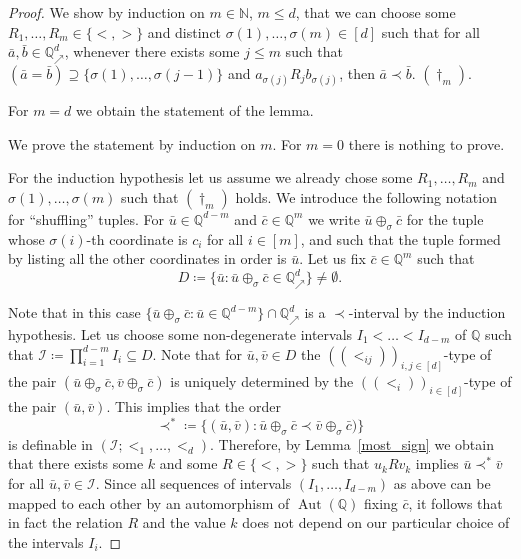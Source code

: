 \documentclass[10pt,a4paper]{amsart}
\newcommand\qup[1]{\mathbb{Q}_\nearrow^{#1}}
\newcommand{\aut}{\operatorname{Aut}}
\newcommand{\shuff}{\oplus}
\begin{document}
\begin{proof}
	We show by induction on $m \in {\mathbb N}$, $m \leq d$, that we can choose some $R_1,\dots,R_m \in \{<,>\}$ and distinct $\sigma(1),\dots,\sigma(m) \in [d]$ such that for all $\bar{a},\bar{b}\in \qup{d}$, whenever there exists some $j\leq m$ such that $(\bar{a}=\bar{b})\supseteq \{\sigma(1),\dots,\sigma(j-1)\}$ and $a_{\sigma(j)} R_j b_{\sigma(j)}$, then $\bar{a}\prec \bar{b}$. $(\dag_m)$.
	
	For $m=d$ we obtain the statement of the lemma.

	We prove the statement by induction on $m$. For $m=0$ there is nothing to prove.
	
	For the induction hypothesis let us assume we already chose some $R_1,\dots,R_m$ and $\sigma(1),\dots,\sigma(m)$ such that $(\dag_m)$ holds. We introduce the following notation for ``shuffling'' tuples. 
    For $\bar{u}\in \mathbb{Q}^{d-m}$ and $\bar{c}\in \mathbb{Q}^m$ we write $\bar{u}\shuff_{\sigma} \bar{c}$ for the tuple whose $\sigma(i)$-th coordinate is $c_i$ for all $i \in [m]$, and such that the tuple formed by listing all the other coordinates in order is $\bar{u}$. Let us fix $\bar{c}\in \mathbb{Q}^m$ such that $$D\coloneqq \{\bar{u}: \bar{u}\shuff_{\sigma} \bar{c}\in \qup{d}\}\neq \emptyset.$$

	Note that in this case $\{\bar{u}\shuff_{\sigma} \bar{c}: \bar{u}\in \mathbb{Q}^{d-m}\}\cap \qup{d}$ is a $\prec$-interval by the induction hypothesis. Let us choose some non-degenerate intervals $I_1<\dots<I_{d-m}$ of $\mathbb{Q}$ such that $\mathcal{I}\coloneqq \prod_{i=1}^{d-m}I_i\subseteq D$. Note that for $\bar{u},\bar{v}\in D$ the $((<_{ij}))_{i,j\in [d]}$-type of the pair $(\bar{u}\shuff_{\sigma} \bar{c}, \bar{v}\shuff_{\sigma} \bar{c})$ is uniquely determined by the $((<_i))_{i\in [d]}$-type of the pair $(\bar{u},\bar{v})$. This implies that the order $$\prec^*\coloneqq \{(\bar{u},\bar{v}): \bar{u}\shuff_{\sigma} \bar{c}\prec \bar{v}\shuff_{\sigma} \bar{c})\}$$ is definable in $(\mathcal{I};<_1,\dots,<_d)$. Therefore, by Lemma~\ref{most_sign} we obtain that there exists some $k$ and some $R\in \{<,>\}$ such that $u_kRv_k$ implies $\bar{u}\prec^*\bar{v}$ for all $\bar{u},\bar{v}\in \mathcal{I}$. Since all sequences of intervals $(I_1,\dots,I_{d-m})$ as above can be mapped to each other by an automorphism of $\aut(\mathbb{Q})$ fixing $\bar{c}$, it follows that in fact the {relation $R$ and the} value $k$ does not depend on our particular choice of the intervals $I_i$.
	

\end{proof}
\end{document}
